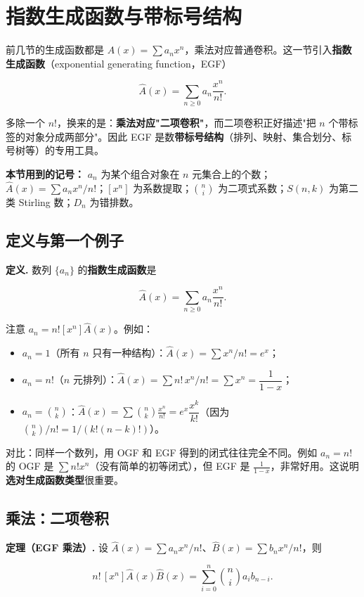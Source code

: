 \section{指数生成函数与带标号结构}


前几节的生成函数都是 $A(x)=\sum a_nx^n$，乘法对应普通卷积。这一节引入\textbf{指数生成函数}（exponential generating function，EGF）

\[
\hat A(x)=\sum_{n\ge0}a_n\frac{x^n}{n!}.
\]

多除一个 $n!$，换来的是：\textbf{乘法对应"二项卷积"}，而二项卷积正好描述"把 $n$ 个带标签的对象分成两部分"。因此 EGF 是数\textbf{带标号结构}（排列、映射、集合划分、标号树等）的专用工具。

\textbf{本节用到的记号：} $a_n$ 为某个组合对象在 $n$ 元集合上的个数；$\hat A(x)=\sum a_nx^n/n!$；$[x^n]$ 为系数提取；$\binom ni$ 为二项式系数；$S(n,k)$ 为第二类 Stirling 数；$D_n$ 为错排数。

\subsection{定义与第一个例子}


\textbf{定义.} 数列 $\{a_n\}$ 的\textbf{指数生成函数}是

\[
\hat A(x)=\sum_{n\ge0}a_n\frac{x^n}{n!}.
\]

注意 $a_n=n![x^n]\hat A(x)$。例如：

\begin{itemize}
\item $a_n=1$（所有 $n$ 只有一种结构）：$\hat A(x)=\sum x^n/n!=e^x$；
\item $a_n=n!$（$n$ 元排列）：$\hat A(x)=\sum n!\,x^n/n!=\sum x^n=\dfrac{1}{1-x}$；
\item $a_n=\binom nk$：$\hat A(x)=\sum\binom nk\frac{x^n}{n!}=e^x\dfrac{x^k}{k!}$（因为 $\binom nk/n!=1/(k!(n-k)!)$）。
\end{itemize}


对比：同样一个数列，用 OGF 和 EGF 得到的闭式往往完全不同。例如 $a_n=n!$ 的 OGF 是 $\sum n!x^n$（没有简单的初等闭式），但 EGF 是 $\frac{1}{1-x}$，非常好用。这说明\textbf{选对生成函数类型}很重要。

\subsection{乘法：二项卷积}


\textbf{定理（EGF 乘法）.} 设 $\hat A(x)=\sum a_nx^n/n!$、$\hat B(x)=\sum b_nx^n/n!$，则

\[
n!\,[x^n]\hat A(x)\hat B(x)=\sum_{i=0}^{n}\binom ni a_i b_{n-i}.
\]

